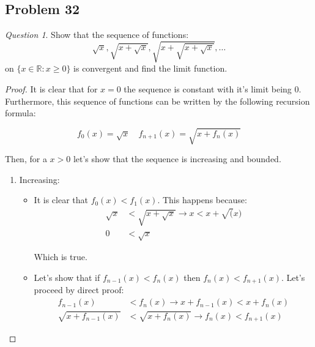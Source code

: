 \documentclass[11pt]{article}
\theoremstyle{definition}
\theoremstyle{remark}
\theoremstyle{remark}
\newtheorem{question}{Question}
\newcommand{\R}{{\mathbb{R}}}
\newcommand{\ri}{\rightarrow}
\begin{document}
\subsection{Problem 32}
\begin{question}
  Show that the sequence of functions:
  \begin{equation*}
    \sqrt{x}, \sqrt{x + \sqrt{x}}, \sqrt{x + \sqrt{x + \sqrt{x}}},
    \dots
  \end{equation*}
  on $\{x \in \R: x \ge 0\}$ is convergent and find the limit
  function.
\end{question}
\begin{proof}

  It is clear that for $x=0$ the sequence is constant with it's limit
  being 0. Furthermore, this sequence of functions can be written by
  the following recursion formula:

  \begin{equation*}
    f_0(x) = \sqrt{x} \quad f_{n+1}(x) = \sqrt{x + f_n(x)}
  \end{equation*}

  Then, for a $x > 0$ let's show that the sequence is increasing and
  bounded.
  \begin{enumerate}
  \item Increasing:
    \begin{itemize}
    \item It is clear that $f_0(x) < f_1(x)$. This happens because:
      \begin{equation*}
        \begin{split}
          \sqrt{x} &< \sqrt{x + \sqrt{x}} \ri x < x + \sqrt(x) \\
          0 &< \sqrt{x}
        \end{split}
      \end{equation*}

      Which is true.
    \item Let's show that if $f_{n-1}(x) < f_n(x)$ then
      $f_n(x) < f_{n+1}(x)$. Let's proceed by direct proof:
      \begin{equation*}
        \begin{split}
          f_{n-1}(x) &< f_n(x) \ri x + f_{n-1}(x) < x + f_n(x) \\
          \sqrt{x + f_{n-1}(x)} &< \sqrt{x + f_n(x)} \ri f_n(x) <
          f_{n+1}(x)
        \end{split}
      \end{equation*}
    \end{itemize}


\end{enumerate}
\end{proof}
\end{document}
